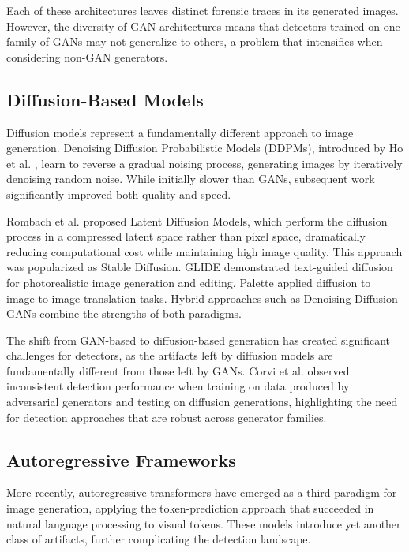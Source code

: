Each of these architectures leaves distinct forensic traces in its generated images. However, the diversity of GAN architectures means that detectors trained on one family of GANs may not generalize to others, a problem that intensifies when considering non-GAN generators.


\subsection{Diffusion-Based Models}\label{sec:diffusion}

Diffusion models represent a fundamentally different approach to image generation. Denoising Diffusion Probabilistic Models (DDPMs), introduced by Ho et al. \cite{ho2020ddpm}, learn to reverse a gradual noising process, generating images by iteratively denoising random noise. While initially slower than GANs, subsequent work significantly improved both quality and speed.

Rombach et al. \cite{rombach2022high} proposed Latent Diffusion Models, which perform the diffusion process in a compressed latent space rather than pixel space, dramatically reducing computational cost while maintaining high image quality. This approach was popularized as Stable Diffusion. GLIDE \cite{nichol2022glide} demonstrated text-guided diffusion for photorealistic image generation and editing. Palette \cite{saharia2022palette} applied diffusion to image-to-image translation tasks. Hybrid approaches such as Denoising Diffusion GANs \cite{xiao2022ddgan} combine the strengths of both paradigms.

The shift from GAN-based to diffusion-based generation has created significant challenges for detectors, as the artifacts left by diffusion models are fundamentally different from those left by GANs. Corvi et al. \cite{corvi2023detection} observed inconsistent detection performance when training on data produced by adversarial generators and testing on diffusion generations, highlighting the need for detection approaches that are robust across generator families.


\subsection{Autoregressive Frameworks}\label{sec:autoregressive}

More recently, autoregressive transformers have emerged as a third paradigm for image generation, applying the token-prediction approach that succeeded in natural language processing to visual tokens. These models introduce yet another class of artifacts, further complicating the detection landscape.

